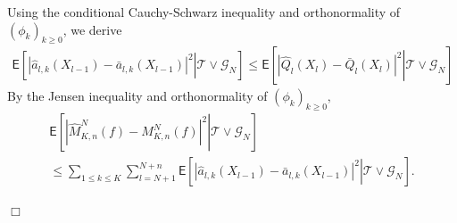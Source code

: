 \documentclass[preprint]{imsart}
\def\TrainSet{\mathcal{T}}
\newcommand{\proofendsign}{$\Box$}
\newenvironment{proof}{{\noindent \bf Proof }}
 {{\hspace*{\fill}\proofendsign\par\bigskip}}
\begin{document}
\begin{proof}
Using the conditional Cauchy-Schwarz inequality and  orthonormality of \((\phi_k)_{k\geq 0}\), we derive
\begin{eqnarray*}
\mathsf{E}\left[\left.\left|\widehat{a}_{l,k}(X_{l-1})-\bar a_{l,k}(X_{l-1})\right|^{2}\right | \TrainSet \vee \mathcal{G}_N\right]\leq\mathsf{E}\left[\left.\left|\widehat{Q}_{l}\left(X_{l}\right)-\bar Q_{l}\left(X_{l}\right)\right|^{2}\right | \TrainSet \vee \mathcal{G}_N\right]
\end{eqnarray*}
By the Jensen inequality and orthonormality of \((\phi_k)_{k\geq 0},\)
\begin{multline*}
\mathsf{E}\left[\left.\left|\widehat{M}_{K,n}^{N}(f)-M_{K,n}^{N}(f)\right|^{2}\right | \TrainSet \vee \mathcal{G}_N\right]
\\
\leq \sum_{1\leq k\le K}\sum_{l=N+1}^{N+n}\mathsf{E}\left[\left.\left|\widehat{a}_{l,k}(X_{l-1})-\bar a_{l,k}(X_{l-1})\right|^{2}\right | \TrainSet \vee \mathcal{G}_N\right].
\end{multline*}
\end{proof}
\end{document}
